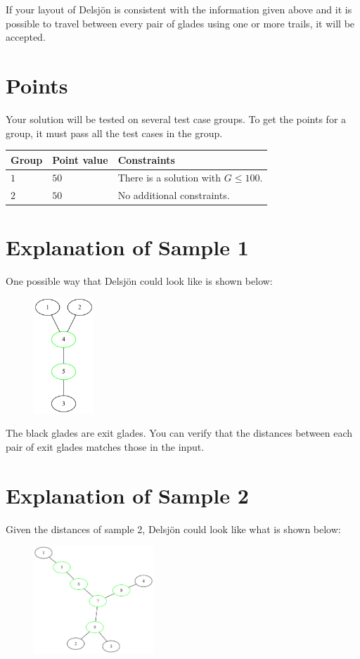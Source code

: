 If your layout of Delsjön is consistent with the information given above and it is possible to travel between
every pair of glades using one or more trails, it will be accepted.

\section*{Points}
Your solution will be tested on several test case groups. To get the points for
a group, it must pass all the test cases in the group.

\noindent
\begin{tabular}{| l | l | p{12cm} |}
  \hline
  \textbf{Group} & \textbf{Point value} & \textbf{Constraints} \\ \hline
  $1$    & $50$       & There is a solution with $G \leq 100$. \\ \hline
  $2$    & $50$       & No additional constraints. \\ \hline
\end{tabular}

\section*{Explanation of Sample 1}
One possible way that Delsjön could look like is shown below: 
\begin{center}
  \begin{figure}[h]
    \centering
    \includegraphics[width=0.2\textwidth]{sample-1.png}
  \end{figure}
\end{center}
The black glades are exit glades. You can verify that the distances 
between each pair of exit glades matches those in the input.

\section*{Explanation of Sample 2}
Given the distances of sample 2, Delsjön could look like what is shown below: 
\begin{center}
  \begin{figure}[h]
    \centering
    \includegraphics[width=0.4\textwidth]{sample-2.png}
  \end{figure}
\end{center}
